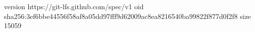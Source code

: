 version https://git-lfs.github.com/spec/v1
oid sha256:3ef6bbe44556f58af8a05dd97fff9d62009ac8ea8216540ba99822f877d0f2f8
size 15059
